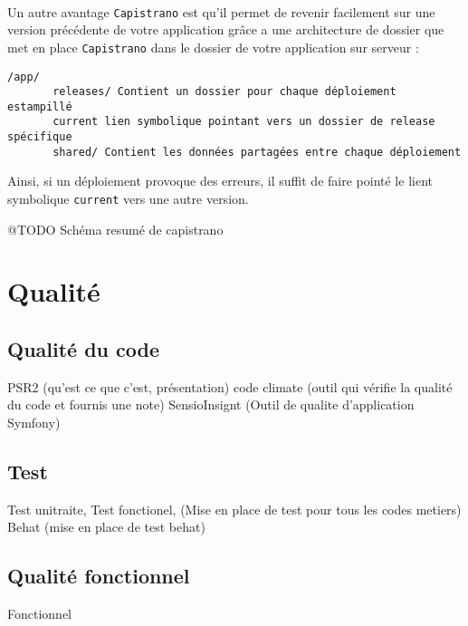 \paragraph{}
Un autre avantage \verb?Capistrano? est qu'il permet de revenir facilement sur une version précédente de votre application grâce a une architecture de dossier que met en place \verb?Capistrano? dans le dossier de votre application sur serveur : 
\begin{verbatim}
/app/
       releases/ Contient un dossier pour chaque déploiement estampillé
       current lien symbolique pointant vers un dossier de release spécifique
       shared/ Contient les données partagées entre chaque déploiement
\end{verbatim}
Ainsi, si un déploiement provoque des erreurs, il suffit de faire pointé le lient symbolique \verb?current? vers une autre version.

@TODO Schéma resumé de capistrano

\section{Qualité}
\subsection{Qualité du code}
PSR2 (qu'est ce que c'est, présentation)
code climate (outil qui vérifie la qualité du code et fournis une note) 
SensioInsignt (Outil de qualite d'application Symfony) 
\subsection{Test}
Test unitraite, Test fonctionel, (Mise en place de test  pour tous les codes metiers) 
Behat (mise en place de test behat) 
\subsection{Qualité fonctionnel}
Fonctionnel
